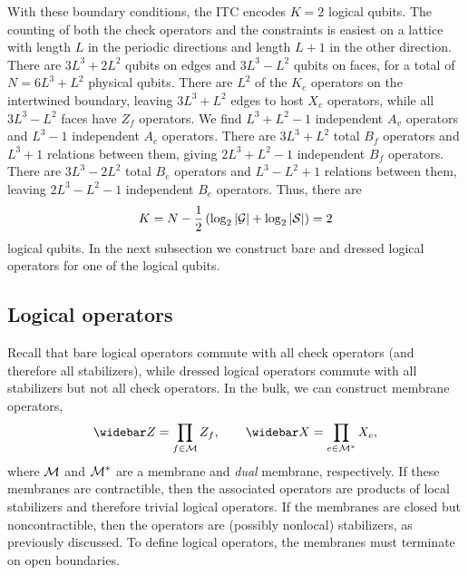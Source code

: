 With these boundary conditions, the ITC encodes $K=2$ logical qubits. The counting of both the check operators and the constraints is easiest on a lattice with length $L$ in the periodic directions and length $L+1$ in the other direction. 
There are $3L^3+2L^2$ qubits on edges and $3L^3-L^2$ qubits on faces, for a total of $N = 6L^3 + L^2$ physical qubits. There are $L^2$ of the $K_e$ operators on the intertwined boundary, leaving $3L^3 + L^2$ edges to host $X_e$ operators, while all $3L^3-L^2$ faces have $Z_f$ operators. We find $L^3+L^2-1$ independent $A_v$ operators and $L^3-1$ independent $A_c$ operators. There are $3L^3+L^2$ total $B_f$ operators and $L^3+1$ relations between them, giving $2L^3+L^2-1$ independent $B_f$ operators. There are $3L^3 - 2L^2$ total $B_e$ operators and $L^3-L^2+1$ relations between them, leaving $2L^3-L^2-1$ independent $B_e$ operators. Thus, there are
\begin{align}
K = N - \frac{1}{2} \left( \log_2 |\G| + \log_2 |\S| \right) = 2
\end{align}
logical qubits. In the next subsection we construct bare and dressed logical operators for one of the logical qubits.

\subsection{Logical operators} \label{sub:logicals}

Recall that bare logical operators commute with all check operators (and therefore all stabilizers), while dressed logical operators commute with all stabilizers but not all check operators. 
In the bulk, we can construct membrane operators, 
\begin{align}
\barelogical{Z} = \prod_{f \in \cal{M}} Z_f, \qquad \barelogical{X} = \prod_{e \in \cal{M}^*} X_e, \label{eqn:logicals}
\end{align}
where $\cal{M}$ and $\cal{M}^*$ are a membrane and \emph{dual} membrane, respectively. If these membranes are contractible, then the associated operators are products of local stabilizers and therefore trivial logical operators. If the membranes are closed but noncontractible, then the operators are (possibly nonlocal) stabilizers, as previously discussed. To define logical operators, the membranes must terminate on open boundaries.

